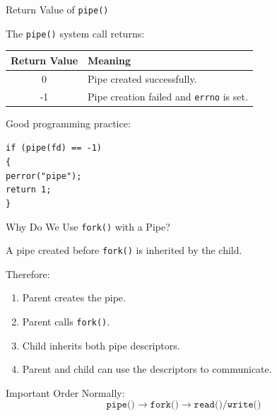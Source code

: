 \documentclass[aspectratio=169]{beamer}
\begin{document}
\begin{frame}{Return Value of \texttt{pipe()}}

The \texttt{pipe()} system call returns:

\begin{center}
\begin{tabular}{|c|p{7cm}|}
\hline
\textbf{Return Value} & \textbf{Meaning} \\
\hline

0 &
Pipe created successfully.
\\
\hline

-1 &
Pipe creation failed and \texttt{errno} is set.
\\
\hline

\end{tabular}
\end{center}

\vspace{0.3cm}

Good programming practice:

\begin{center}
\texttt{if (pipe(fd) == -1)}\\
\texttt{\{}\\
\texttt{\quad perror("pipe");}\\
\texttt{\quad return 1;}\\
\texttt{\}}
\end{center}

\end{frame}

\begin{frame}{Why Do We Use \texttt{fork()} with a Pipe?}

A pipe created before \texttt{fork()} is inherited by the child.

Therefore:

\begin{enumerate}
    \item Parent creates the pipe.
    \item Parent calls \texttt{fork()}.
    \item Child inherits both pipe descriptors.
    \item Parent and child can use the descriptors to communicate.
\end{enumerate}

\begin{alertblock}{Important Order}
Normally:
\[
\boxed{
\texttt{pipe()}
\rightarrow
\texttt{fork()}
\rightarrow
\texttt{read()/write()}
}
\]
\end{alertblock}

\end{frame}
\end{document}
